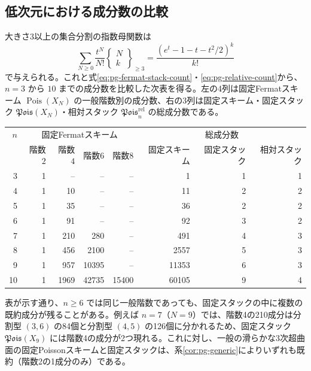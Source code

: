 \subsection{低次元における成分数の比較}
大きさ3以上の集合分割の指数母関数は
\begin{equation}\label{eq:pg-fermat-egf}
\sum_{N\ge0}\frac{t^N}{N!}
\left\{\begin{smallmatrix}N\\k\end{smallmatrix}\right\}_{\ge3}
=\frac{(e^t-1-t-t^2/2)^k}{k!}
\end{equation}
で与えられる。これと式\eqref{eq:pg-fermat-stack-count}・\eqref{eq:pg-relative-count}から、$n=3$ から $10$ までの成分数を比較した次表を得る。左の4列は固定Fermatスキーム $\operatorname{Pois}(X_N)$ の一般階数別の成分数、右の3列は固定スキーム・固定スタック $\mathfrak{Pois}(X_N)$・相対スタック $\mathfrak{Pois}^{\mathrm{rel}}_n$ の総成分数である。

\begin{center}
\small
\begin{tabular}{r|rrrr|rrr}
\toprule
$n$ & \multicolumn{4}{c|}{固定Fermatスキーム} & \multicolumn{3}{c}{総成分数} \\
& 階数$2$ & 階数$4$ & 階数$6$ & 階数$8$
& 固定スキーム & 固定スタック & 相対スタック \\
\midrule
3 & 1 & -- & -- & -- & 1 & 1 & 1 \\
4 & 1 & 10 & -- & -- & 11 & 2 & 2 \\
5 & 1 & 35 & -- & -- & 36 & 2 & 2 \\
6 & 1 & 91 & -- & -- & 92 & 3 & 2 \\
7 & 1 & 210 & 280 & -- & 491 & 4 & 3 \\
8 & 1 & 456 & 2100 & -- & 2557 & 5 & 3 \\
9 & 1 & 957 & 10395 & -- & 11353 & 6 & 3 \\
10 & 1 & 1969 & 42735 & 15400 & 60105 & 9 & 4 \\
\bottomrule
\end{tabular}
\end{center}

表が示す通り、$n\ge6$ では同じ一般階数であっても、固定スタックの中に複数の既約成分が残ることがある。例えば $n=7$（$N=9$）では、階数4の210成分は分割型 $(3,6)$ の84個と分割型 $(4,5)$ の126個に分かれるため、固定スタック $\mathfrak{Pois}(X_9)$ には階数4の成分が2つ現れる。これに対し、一般の滑らかな3次超曲面の固定Poissonスキームと固定スタックは、系\ref{cor:pg-generic}によりいずれも既約（階数2の1成分のみ）である。
